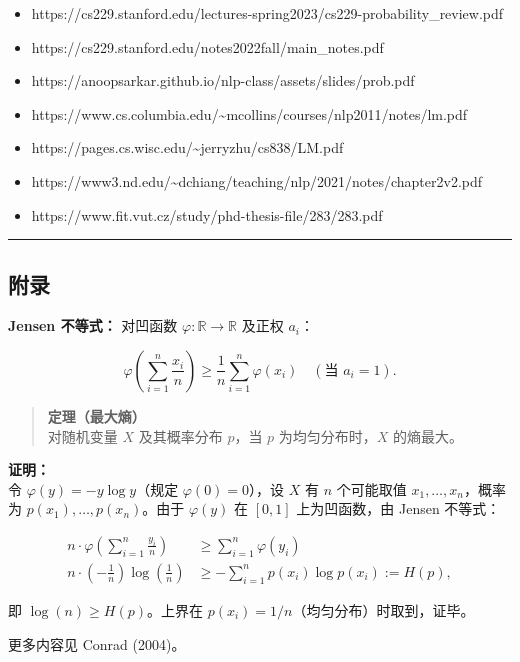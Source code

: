 \documentclass[
  11pt,
  a4paper,
]{article}
\providecommand{\tightlist}{%
  \setlength{\itemsep}{0pt}\setlength{\parskip}{0pt}}
\begin{document}
\begin{itemize}
\tightlist
\item
  https://cs229.stanford.edu/lectures-spring2023/cs229-probability\_review.pdf
\item
  https://cs229.stanford.edu/notes2022fall/main\_notes.pdf
\item
  https://anoopsarkar.github.io/nlp-class/assets/slides/prob.pdf
\item
  https://www.cs.columbia.edu/\textasciitilde mcollins/courses/nlp2011/notes/lm.pdf
\item
  https://pages.cs.wisc.edu/\textasciitilde jerryzhu/cs838/LM.pdf
\item
  https://www3.nd.edu/\textasciitilde dchiang/teaching/nlp/2021/notes/chapter2v2.pdf
\item
  https://www.fit.vut.cz/study/phd-thesis-file/283/283.pdf
\end{itemize}

\begin{center}\rule{0.5\linewidth}{0.5pt}\end{center}

\subsection{附录}\label{ux9644ux5f55}

\textbf{Jensen 不等式：} 对凹函数 \(\varphi: \mathbb{R} \to \mathbb{R}\)
及正权 \(a_i\)：

\[\varphi\!\left(\sum_{i=1}^n \frac{x_i}{n}\right) \geq \frac{1}{n} \sum_{i=1}^n \varphi(x_i) \quad (\text{当 } a_i = 1).\]

\begin{quote}
\textbf{定理（最大熵）}\\
对随机变量 \(X\) 及其概率分布 \(p\)，当 \(p\) 为均匀分布时，\(X\)
的熵最大。
\end{quote}

\textbf{证明：}\\
令 \(\varphi(y) = -y \log y\)（规定 \(\varphi(0) = 0\)），设 \(X\) 有
\(n\) 个可能取值 \(x_1, \ldots, x_n\)，概率为
\(p(x_1), \ldots, p(x_n)\)。由于 \(\varphi(y)\) 在 \([0,1]\)
上为凹函数，由 Jensen 不等式：

\[\begin{aligned}
n \cdot \varphi\!\left(\sum_{i=1}^n \frac{y_i}{n}\right) &\geq \sum_{i=1}^n \varphi(y_i) \\
n \cdot \left(-\frac{1}{n}\right) \log\!\left(\frac{1}{n}\right) &\geq -\sum_{i=1}^n p(x_i) \log p(x_i) := H(p),
\end{aligned}\]

即 \(\log(n) \geq H(p)\)。上界在
\(p(x_i) = 1/n\)（均匀分布）时取到，证毕。

更多内容见 Conrad (2004)。
\end{document}
